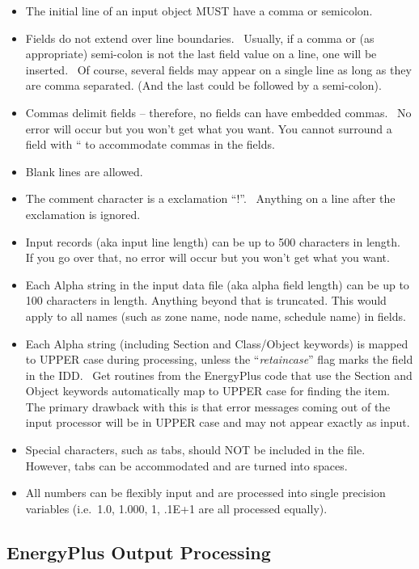 \begin{itemize}
\item
  The initial line of an input object MUST have a comma or semicolon.
\item
  Fields do not extend over line boundaries.~ Usually, if a comma or (as appropriate) semi-colon is not the last field value on a line, one will be inserted.~ Of course, several fields may appear on a single line as long as they are comma separated. (And the last could be followed by a semi-colon).
\item
  Commas delimit fields -- therefore, no fields can have embedded commas.~ No error will occur but you won't get what you want. You cannot surround a field with `` to accommodate commas in the fields.
\item
  Blank lines are allowed.
\item
  The comment character is a exclamation ``!''.~ Anything on a line after the exclamation is ignored.
\item
  Input records (aka input line length) can be up to 500 characters in length.~ If you go over that, no error will occur but you won't get what you want.
\item
  Each Alpha string in the input data file (aka alpha field length) can be up to 100 characters in length. Anything beyond that is truncated. This would apply to all names (such as zone name, node name, schedule name) in fields.
\item
  Each Alpha string (including Section and Class/Object keywords) is mapped to UPPER case during processing, unless the ``\emph{retaincase}'' flag marks the field in the IDD.~ Get routines from the EnergyPlus code that use the Section and Object keywords automatically map to UPPER case for finding the item.~ The primary drawback with this is that error messages coming out of the input processor will be in UPPER case and may not appear exactly as input.
\item
  Special characters, such as tabs, should NOT be included in the file.~ However, tabs can be accommodated and are turned into spaces.
\item
  All numbers can be flexibly input and are processed into single precision variables (i.e.~1.0, 1.000, 1, .1E+1 are all processed equally).
\end{itemize}

\subsection{EnergyPlus Output Processing}\label{energyplus-output-processing}

